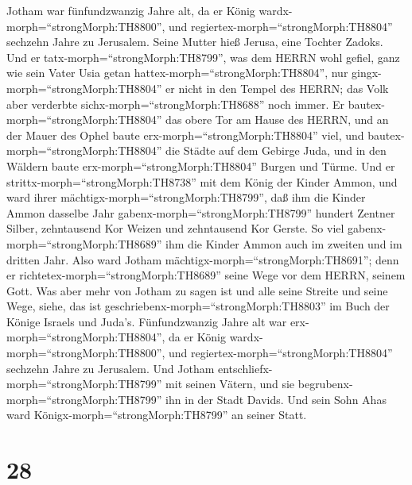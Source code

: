  Jotham war fünfundzwanzig Jahre alt, da er König
wardx-morph=``strongMorph:TH8800'', und
regiertex-morph=``strongMorph:TH8804'' sechzehn Jahre zu Jerusalem.
Seine Mutter hieß Jerusa, eine Tochter Zadoks.  Und er
tatx-morph=``strongMorph:TH8799'', was dem HERRN wohl gefiel, ganz wie
sein Vater Usia getan hattex-morph=``strongMorph:TH8804'', nur
gingx-morph=``strongMorph:TH8804'' er nicht in den Tempel des HERRN; das
Volk aber verderbte sichx-morph=``strongMorph:TH8688'' noch immer.
 Er bautex-morph=``strongMorph:TH8804'' das obere Tor am
Hause des HERRN, und an der Mauer des Ophel baute
erx-morph=``strongMorph:TH8804'' viel,  und
bautex-morph=``strongMorph:TH8804'' die Städte auf dem Gebirge Juda, und
in den Wäldern baute erx-morph=``strongMorph:TH8804'' Burgen und Türme.
 Und er strittx-morph=``strongMorph:TH8738'' mit dem König
der Kinder Ammon, und ward ihrer mächtigx-morph=``strongMorph:TH8799'',
daß ihm die Kinder Ammon dasselbe Jahr
gabenx-morph=``strongMorph:TH8799'' hundert Zentner Silber, zehntausend
Kor Weizen und zehntausend Kor Gerste. So viel
gabenx-morph=``strongMorph:TH8689'' ihm die Kinder Ammon auch im zweiten
und im dritten Jahr.  Also ward Jotham
mächtigx-morph=``strongMorph:TH8691''; denn er
richtetex-morph=``strongMorph:TH8689'' seine Wege vor dem HERRN, seinem
Gott.  Was aber mehr von Jotham zu sagen ist und alle seine
Streite und seine Wege, siehe, das ist
geschriebenx-morph=``strongMorph:TH8803'' im Buch der Könige Israels und
Juda's.  Fünfundzwanzig Jahre alt war
erx-morph=``strongMorph:TH8804'', da er König
wardx-morph=``strongMorph:TH8800'', und
regiertex-morph=``strongMorph:TH8804'' sechzehn Jahre zu Jerusalem.
 Und Jotham entschliefx-morph=``strongMorph:TH8799'' mit
seinen Vätern, und sie begrubenx-morph=``strongMorph:TH8799'' ihn in der
Stadt Davids. Und sein Sohn Ahas ward
Königx-morph=``strongMorph:TH8799'' an seiner Statt.

\hypertarget{section-27}{%
\section{28}\label{section-27}}

